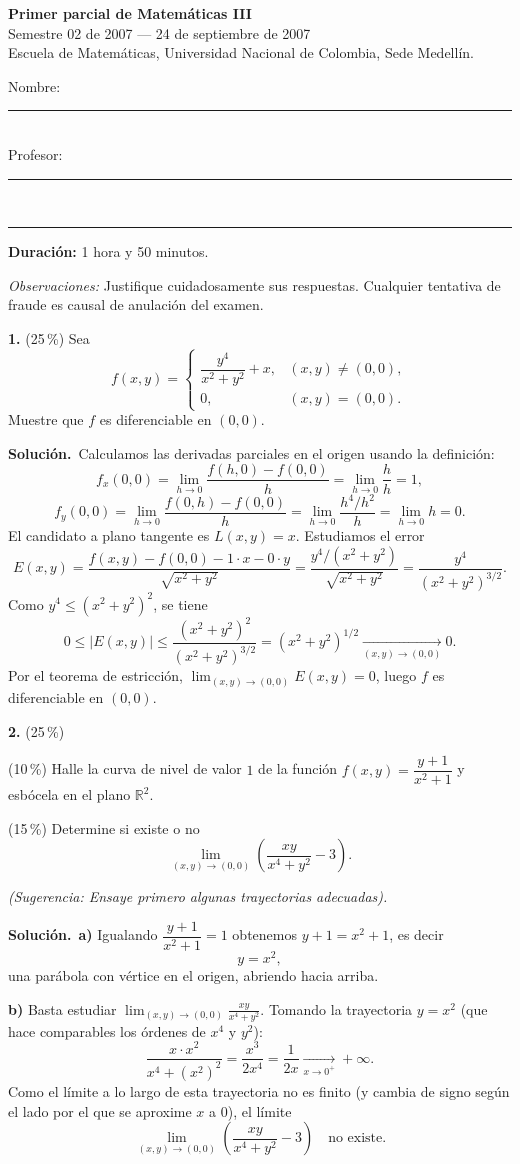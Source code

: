 \documentclass[11pt]{article}
\newcommand{\sol}{\medskip\noindent\textbf{\textcolor{solgreen}{Soluci\'on.}}\ }
\newcommand{\examheader}{%
  \noindent
  \begin{minipage}[t]{0.62\linewidth}
    {\bfseries\large Primer parcial de Matem\'aticas III}\\
    {\small Semestre 02 de 2007 --- 24 de septiembre de 2007}\\
    {\small Escuela de Matem\'aticas, Universidad Nacional de Colombia, Sede Medell\'in.}
  \end{minipage}%
  \hfill
  \begin{minipage}[t]{0.33\linewidth}
    \raggedleft\small
    Nombre: \rule{2.8cm}{0.4pt}\\[4pt]
    Profesor: \rule{2.5cm}{0.4pt}
  \end{minipage}\\[4pt]
  \rule{\linewidth}{0.6pt}
}
\begin{document}
\examheader

\textbf{Duraci\'on:} 1 hora y 50 minutos.

\textit{Observaciones:} Justifique cuidadosamente sus respuestas. Cualquier tentativa de fraude es causal de anulaci\'on del examen.

\bigskip
\noindent\textbf{1.} (25\,\%) Sea
$$
f(x,y)=
\begin{cases}
\dfrac{y^4}{x^2+y^2}+x, & (x,y)\neq (0,0),\\[6pt]
0, & (x,y)=(0,0).
\end{cases}
$$
Muestre que $f$ es diferenciable en $(0,0)$.

\sol Calculamos las derivadas parciales en el origen usando la definici\'on:
$$f_x(0,0) = \lim_{h\to 0} \frac{f(h,0)-f(0,0)}{h} = \lim_{h\to 0} \frac{h}{h} = 1,$$
$$f_y(0,0) = \lim_{h\to 0} \frac{f(0,h)-f(0,0)}{h} = \lim_{h\to 0} \frac{h^4/h^2}{h} = \lim_{h\to 0} h = 0.$$
El candidato a plano tangente es $L(x,y)=x$. Estudiamos el error
$$E(x,y) = \frac{f(x,y)-f(0,0)-1\cdot x - 0\cdot y}{\sqrt{x^2+y^2}} = \frac{y^4/(x^2+y^2)}{\sqrt{x^2+y^2}} = \frac{y^4}{(x^2+y^2)^{3/2}}.$$
Como $y^4 \leq (x^2+y^2)^2$, se tiene
$$0 \leq |E(x,y)| \leq \frac{(x^2+y^2)^2}{(x^2+y^2)^{3/2}} = (x^2+y^2)^{1/2} \xrightarrow[(x,y)\to(0,0)]{} 0.$$
Por el teorema de estricci\'on, $\displaystyle\lim_{(x,y)\to(0,0)} E(x,y)=0$, luego $f$ es diferenciable en $(0,0)$.

\bigskip
\noindent\textbf{2.} (25\,\%)
\begin{opciones}
  \item[a)] (10\,\%) Halle la curva de nivel de valor $1$ de la funci\'on $f(x,y)=\dfrac{y+1}{x^2+1}$ y esb\'ocela en el plano $\mathbb{R}^2$.
  \item[b)] (15\,\%) Determine si existe o no
  $$\lim_{(x,y)\to(0,0)} \left(\frac{xy}{x^4+y^2}-3\right).$$
\end{opciones}

\textit{(Sugerencia: Ensaye primero algunas trayectorias adecuadas).}

\sol \textbf{a)} Igualando $\dfrac{y+1}{x^2+1}=1$ obtenemos $y+1=x^2+1$, es decir
$$y = x^2,$$
una par\'abola con v\'ertice en el origen, abriendo hacia arriba.

\textbf{b)} Basta estudiar $\displaystyle\lim_{(x,y)\to(0,0)} \frac{xy}{x^4+y^2}$. Tomando la trayectoria $y=x^2$ (que hace comparables los \'ordenes de $x^4$ y $y^2$):
$$\frac{x\cdot x^2}{x^4+(x^2)^2} = \frac{x^3}{2x^4} = \frac{1}{2x} \xrightarrow[x\to 0^+]{} +\infty.$$
Como el l\'imite a lo largo de esta trayectoria no es finito (y cambia de signo seg\'un el lado por el que se aproxime $x$ a $0$), el l\'imite
$$\lim_{(x,y)\to(0,0)} \left(\frac{xy}{x^4+y^2}-3\right) \quad \text{no existe.}$$
\end{document}
